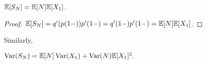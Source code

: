 \begin{corollary}
    $ {\mathbb{E}}[S_N] ={\mathbb{E}}[N]{\mathbb{E}}[X_1] $.
\end{corollary}
\begin{proof}
    $ {\mathbb{E}}[S_N]= q'(p(1-)) p'(1-)=q'(1-)p'(1-)={\mathbb{E}}[N]{\mathbb{E}}[X_1]$.
\end{proof}
Similarly,
\begin{corollary}
    $ \operatorname{Var}(S_N)={\mathbb{E}}[N]\operatorname{Var}(X_1)+\operatorname{Var}(N){\mathbb{E}}[X_1]^2 . $
\end{corollary}